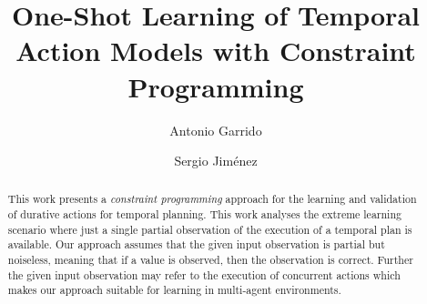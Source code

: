\documentclass[runningheads]{llncs}
\begin{document}
\title{One-Shot Learning of Temporal Action Models with Constraint Programming}


%
\author{Antonio Garrido \and Sergio Jim\'enez}

%

\maketitle              %

\begin{abstract}
  This work presents a {\em constraint programming} approach for the learning and validation of durative actions for temporal planning. This work analyses the extreme learning scenario where just a single partial observation of the execution of a temporal plan is available. Our approach assumes that the given input observation is partial but noiseless, meaning that if a value is observed, then the observation is correct. Further the given input observation may refer to the execution of concurrent actions which makes our approach suitable for learning in multi-agent environments.  
  



\end{abstract}
\end{document}
